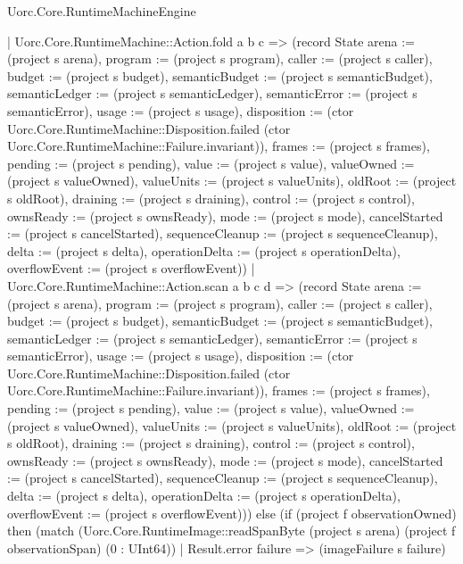 \begin{lexlean}{Uorc.Core.RuntimeMachineEngine}
\begin{semanticmodule}
{      | Uorc.Core.RuntimeMachine::Action.fold a b c => (record State {arena := (project s arena), program := (project s program), caller := (project s caller), budget := (project s budget), semanticBudget := (project s semanticBudget), semanticLedger := (project s semanticLedger), semanticError := (project s semanticError), usage := (project s usage), disposition := (ctor Uorc.Core.RuntimeMachine::Disposition.failed (ctor Uorc.Core.RuntimeMachine::Failure.invariant)), frames := (project s frames), pending := (project s pending), value := (project s value), valueOwned := (project s valueOwned), valueUnits := (project s valueUnits), oldRoot := (project s oldRoot), draining := (project s draining), control := (project s control), ownsReady := (project s ownsReady), mode := (project s mode), cancelStarted := (project s cancelStarted), sequenceCleanup := (project s sequenceCleanup), delta := (project s delta), operationDelta := (project s operationDelta), overflowEvent := (project s overflowEvent)})
      | Uorc.Core.RuntimeMachine::Action.scan a b c d => (record State {arena := (project s arena), program := (project s program), caller := (project s caller), budget := (project s budget), semanticBudget := (project s semanticBudget), semanticLedger := (project s semanticLedger), semanticError := (project s semanticError), usage := (project s usage), disposition := (ctor Uorc.Core.RuntimeMachine::Disposition.failed (ctor Uorc.Core.RuntimeMachine::Failure.invariant)), frames := (project s frames), pending := (project s pending), value := (project s value), valueOwned := (project s valueOwned), valueUnits := (project s valueUnits), oldRoot := (project s oldRoot), draining := (project s draining), control := (project s control), ownsReady := (project s ownsReady), mode := (project s mode), cancelStarted := (project s cancelStarted), sequenceCleanup := (project s sequenceCleanup), delta := (project s delta), operationDelta := (project s operationDelta), overflowEvent := (project s overflowEvent)})) else (if (project f observationOwned) then (match (Uorc.Core.RuntimeImage::readSpanByte (project s arena) (project f observationSpan) (0 : UInt64))
      | Result.error failure => (imageFailure s failure)
}
\end{semanticmodule}
\end{lexlean}
